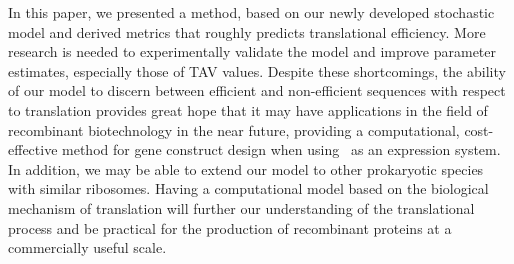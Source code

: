 \documentclass[12pt]{article}
\begin{document}
In this paper, we presented a method, based on our newly
developed stochastic model and derived metrics that roughly predicts
translational efficiency.  More research is needed to
experimentally validate the model and improve parameter
estimates, especially those of TAV values. Despite these
shortcomings, the ability of our model to discern between efficient
and non-efficient sequences with respect to translation 
provides great hope that it may have applications in the field of
recombinant biotechnology in the near future, providing a
computational, cost-effective method for gene construct
design when using \ecoli\ as an expression system.  In addition, 
we may be able to extend our model to other prokaryotic species with 
similar ribosomes.  Having a computational model based on the biological
mechanism of translation will further our understanding of the
translational process and be practical for the production of
recombinant proteins at a commercially useful scale.

{}
\begin{singlespace}  \end{singlespace}
\end{document}
